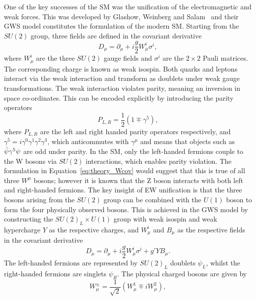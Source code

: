 One of the key successes of the SM was the unification of the electromagnetic and weak forces.
This was developed by Glashow, Weinberg and Salam~\cite{Glashow,Weinberg,Salam} 
and their GWS model constitutes the formulation of the modern SM.
Starting from the $SU(2)$ group, three fields are defined in the covariant derivative
\begin{equation}
\label{eq:theory_Wcov}
D_\mu = \partial_\mu + i \frac{g}{2} W_\mu^i \sigma^i ,
\end{equation}
where $W_\mu^i$ are the three $SU(2)$ gauge fields and $\sigma^i$ are the $2\times2$ Pauli matrices.
The corresponding charge is known as weak isospin. 
Both quarks and leptons interact via the weak interaction 
and transform as doublets under weak gauge transformations.
The weak interaction violates parity, meaning an inversion in space co-ordinates.
This can be encoded explicitly by introducing the parity operators
\begin{equation}
P_{L,R} = \frac{1}{2} (1 \mp \gamma^5) ,
\end{equation}
where $P_{L,R}$ are the left and right handed parity operators respectively, 
and $\gamma^5 = i\gamma^0\gamma^1\gamma^2\gamma^3$, 
which anticommutes with $\gamma^\mu$ and means that objects such as $\bar{\psi} \gamma^5 \psi$
are odd under parity.
In the SM, only the left-handed fermions couple to the W bosons via $SU(2)$ interactions, 
which enables parity violation.
The formulation in Equation~\ref{eq:theory_Wcov} would suggest 
that this is true of all three $W^{\mu}$ bosons;
however it is known that the Z boson interacts with both left and right-handed fermions.
The key insight of EW unification is that the three bosons arising from the $SU(2)$ group 
can be combined with the $U(1)$ boson to form the four physically observed bosons.
This is achieved in the GWS model by constructing the $SU(2)_L \times U(1)$ group 
with weak isospin and weak hypercharge $Y$ as the respective charges, 
and $W^{i}_{\mu}$ and $B_{\mu}$ as the respective fields in the covariant derivative
\begin{equation}
\label{eq:theory_EWcov}
D_\mu = \partial_\mu + i \frac{g}{2} W_\mu^i \sigma^i + g' Y B_\mu .
\end{equation}
The left-handed fermions are represented by $SU(2)_L$ doublets $\psi_L$, 
whilst the right-handed fermions are singlets $\psi_R$.
The physical charged bosons are given by
\begin{equation}
W_\mu^\pm = \frac{1}{\sqrt{2}} (W_\mu^1 \mp iW_\mu^2) ,
\end{equation}
